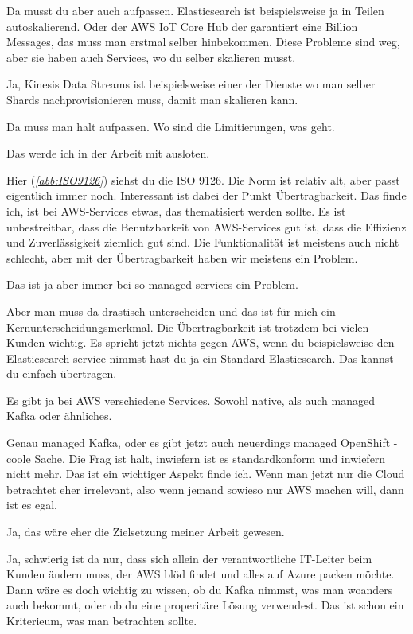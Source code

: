 \RB Da musst du aber auch aufpassen. Elasticsearch ist beispielsweise ja in Teilen autoskalierend. Oder der AWS IoT Core Hub der garantiert eine Billion Messages, das muss man erstmal selber hinbekommen. Diese Probleme sind weg, aber sie haben auch Services, wo du selber skalieren musst. 

\LF Ja, Kinesis Data Streams ist beispielsweise einer der Dienste wo man selber Shards nachprovisionieren muss, damit man skalieren kann.

\RB Da muss man halt aufpassen. Wo sind die Limitierungen, was geht.

\LF Das werde ich in der Arbeit mit ausloten.

\RB Hier (\textit{\autoref{abb:ISO9126}}) siehst du die ISO 9126. Die Norm ist relativ alt, aber passt eigentlich immer noch. Interessant ist dabei der Punkt Übertragbarkeit. Das finde ich, ist bei \ac{AWS}-Services etwas, das thematisiert werden sollte. Es ist unbestreitbar, dass die Benutzbarkeit von \ac{AWS}-Services gut ist, dass die Effizienz und Zuverlässigkeit ziemlich gut sind. Die Funktionalität ist meistens auch nicht schlecht, aber mit der Übertragbarkeit haben wir meistens ein Problem.

\LF Das ist ja aber immer bei so managed services ein Problem.

\RB Aber man muss da drastisch unterscheiden und das ist für mich ein Kernunterscheidungsmerkmal. Die Übertragbarkeit ist trotzdem bei vielen Kunden wichtig. Es spricht jetzt nichts gegen \ac{AWS}, wenn du beispielsweise den Elasticsearch service nimmst hast du ja ein Standard Elasticsearch. Das kannst du einfach übertragen.

\LF Es gibt ja bei \ac{AWS} verschiedene Services. Sowohl native, als auch managed Kafka oder ähnliches.

\RB Genau managed Kafka, oder es gibt jetzt auch neuerdings managed OpenShift - coole Sache. Die Frag ist  halt, inwiefern ist es standardkonform und inwiefern nicht mehr. Das ist ein wichtiger Aspekt finde ich. Wenn man jetzt nur die Cloud betrachtet eher irrelevant, also wenn jemand sowieso nur \ac{AWS} machen will, dann ist es egal.

\LF Ja, das wäre eher die Zielsetzung meiner Arbeit gewesen.

\RB Ja, schwierig ist da nur, dass sich allein der verantwortliche IT-Leiter beim Kunden ändern muss, der \ac{AWS} blöd findet und alles auf Azure packen möchte. Dann wäre es doch wichtig zu wissen, ob du Kafka nimmst, was man woanders auch bekommt, oder ob du eine properitäre Lösung verwendest. Das ist schon ein Kriterieum, was man betrachten sollte.

